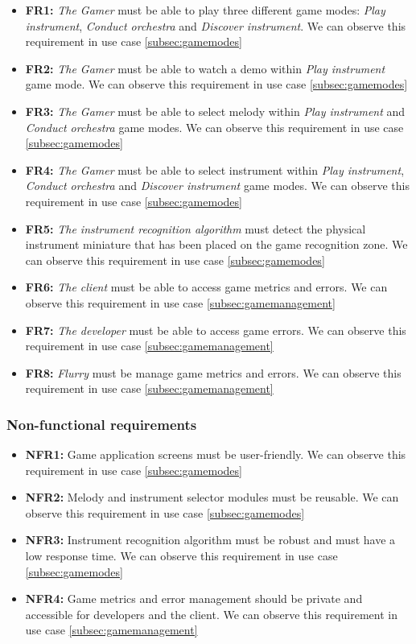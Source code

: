 \begin{itemize}
\item \textbf{FR1:} \textit{The Gamer} must be able to play three different game modes: \textit{Play instrument}, \textit{Conduct orchestra} and \textit{Discover instrument}. We can observe this requirement in use case \ref{subsec:gamemodes}
\item \textbf{FR2:} \textit{The Gamer} must be able to watch a demo within \textit{Play instrument} game mode. We can observe this requirement in use case \ref{subsec:gamemodes}
\item \textbf{FR3:} \textit{The Gamer} must be able to select melody within \textit{Play instrument} and \textit{Conduct orchestra} game modes. We can observe this requirement in use case \ref{subsec:gamemodes}
\item \textbf{FR4:} \textit{The Gamer} must be able to select instrument within \textit{Play instrument}, \textit{Conduct orchestra} and \textit{Discover instrument} game modes. We can observe this requirement in use case \ref{subsec:gamemodes}
\item \textbf{FR5:} \textit{The instrument recognition algorithm} must detect the physical instrument miniature that has been placed on the game recognition zone. We can observe this requirement in use case \ref{subsec:gamemodes}
\item \textbf{FR6:} \textit{The client} must be able to access game metrics and errors. We can observe this requirement in use case \ref{subsec:gamemanagement}
\item \textbf{FR7:} \textit{The developer} must be able to access game errors. We can observe this requirement in use case \ref{subsec:gamemanagement}
\item \textbf{FR8:} \textit{Flurry} must be manage game metrics and errors. We can observe this requirement in use case \ref{subsec:gamemanagement}
\end{itemize}

\subsubsection{Non-functional requirements}
\begin{itemize}
\item \textbf{NFR1:} Game application screens must be user-friendly. We can observe this requirement in use case \ref{subsec:gamemodes}
\item \textbf{NFR2:} Melody and instrument selector modules must be reusable. We can observe this requirement in use case \ref{subsec:gamemodes}
\item \textbf{NFR3:} Instrument recognition algorithm must be robust and must have a low response time. We can observe this requirement in use case \ref{subsec:gamemodes}
\item \textbf{NFR4:} Game metrics and error management should be private and accessible for developers and the client. We can observe this requirement in use case \ref{subsec:gamemanagement}
\end{itemize}

